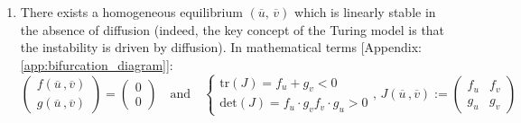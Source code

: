 \begin{enumerate}
	\item There exists a homogeneous equilibrium $(\overline{u},\, \overline{v})$ which is linearly stable in the absence of diffusion (indeed, the key concept of the Turing model is that the instability is driven by diffusion). In mathematical terms [Appendix: \ref{app:bifurcation_diagram}]:
\begin{equation}
\begin{pmatrix}
    f(\overline{u}\,, \overline{v}) \\
    g(\overline{u}\,, \overline{v}) 
\end{pmatrix}
= 
\begin{pmatrix}
    0 \\
    0 
\end{pmatrix}
\quad \text{and} 
            \quad
 		\begin{cases}
 			\text{tr}(J)= f_u + g_v < 0\\
 			\text{det}(J) = f_u\cdot g_v f_v\cdot g_u>0
 		\end{cases},\,
      J(\overline{u}\,, \overline{v}) := 
		\begin{pmatrix}
 			f_u & f_v \\
 			g_u & g_v
 		\end{pmatrix}
  \label{eq:basic_1}
\end{equation}
	

\end{enumerate}
